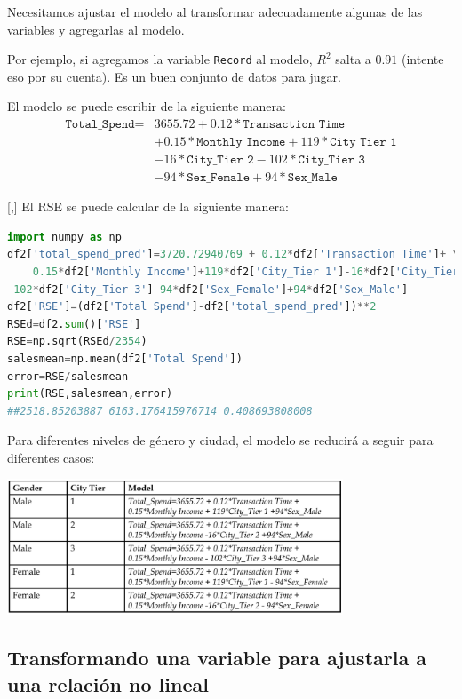Necesitamos ajustar el
modelo al transformar adecuadamente algunas de las variables y agregarlas al modelo. 

Por ejemplo, si agregamos la variable \texttt{Record} al modelo, $R^2$ salta a $0.91$ (intente eso
por su cuenta). Es un buen conjunto de datos para jugar.

El modelo se puede escribir de la siguiente manera:
\begin{align}
\texttt{Total\_Spend}= & 3655.72+0.12*\texttt{Transaction Time} \\ &+0.15*\texttt{Monthly Income}+119*\texttt{City\_Tier 1}\\
& -16*\texttt{City\_Tier 2} - 102*\texttt{City\_Tier 3}\\
& -94*\texttt{Sex\_Female}+94*\texttt{Sex\_Male}
\end{align}

[,]{}
El RSE se puede calcular de la siguiente manera:

\begin{lstlisting}[language=Python]
import numpy as np
df2['total_spend_pred']=3720.72940769 + 0.12*df2['Transaction Time']+ \
    0.15*df2['Monthly Income']+119*df2['City_Tier 1']-16*df2['City_Tier 2']
-102*df2['City_Tier 3']-94*df2['Sex_Female']+94*df2['Sex_Male']
df2['RSE']=(df2['Total Spend']-df2['total_spend_pred'])**2
RSEd=df2.sum()['RSE']
RSE=np.sqrt(RSEd/2354)
salesmean=np.mean(df2['Total Spend'])
error=RSE/salesmean
print(RSE,salesmean,error)
##2518.85203887 6163.176415976714 0.408693808008
\end{lstlisting}


Para diferentes niveles de género y ciudad, el modelo se reducirá a seguir para
diferentes casos:
\begin{center}
 \includegraphics[width=10cm,keepaspectratio=true]{./images/dummies.png}
\end{center}



\subsection{Transformando una variable para ajustarla a una relación no lineal}

